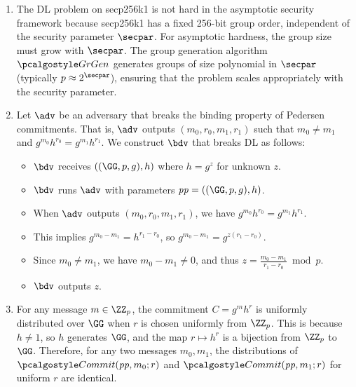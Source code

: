 \begin{enumerate}
  \item The DL problem on secp256k1 is not hard in the asymptotic security framework because secp256k1 has a fixed 256-bit group order, independent of the security parameter $\secpar$.
        For asymptotic hardness, the group size must grow with $\secpar$.
        The group generation algorithm $\grgen$ generates groups of size polynomial in $\secpar$ (typically $p \approx 2^\secpar$), ensuring that the problem scales appropriately with the security parameter.
        
  \item Let $\adv$ be an adversary that breaks the binding property of Pedersen commitments.
        That is, $\adv$ outputs $(m_0, r_0, m_1, r_1)$ such that $m_0 \neq m_1$ and $g^{m_0}h^{r_0} = g^{m_1}h^{r_1}$.
        We construct $\bdv$ that breaks DL as follows:
        \begin{itemize}
          \item $\bdv$ receives $(\gparam, h)$ where $h = g^z$ for unknown $z$.
          \item $\bdv$ runs $\adv$ with parameters $\params = (\gparam, h)$.
          \item When $\adv$ outputs $(m_0, r_0, m_1, r_1)$, we have $g^{m_0}h^{r_0} = g^{m_1}h^{r_1}$.
          \item This implies $g^{m_0 - m_1} = h^{r_1 - r_0}$, so $g^{m_0 - m_1} = g^{z(r_1 - r_0)}$.
          \item Since $m_0 \neq m_1$, we have $m_0 - m_1 \neq 0$, and thus $z = \frac{m_0 - m_1}{r_1 - r_0} \bmod p$.
          \item $\bdv$ outputs $z$.
        \end{itemize}
        
  \item For any message $m \in \ZZ_p$, the commitment $C = g^m h^r$ is uniformly distributed over $\GG$ when $r$ is chosen uniformly from $\ZZ_p$.
        This is because $h \neq 1$, so $h$ generates $\GG$, and the map $r \mapsto h^r$ is a bijection from $\ZZ_p$ to $\GG$.
        Therefore, for any two messages $m_0, m_1$, the distributions of $\algo{Commit}(\params, m_0; r)$ and $\algo{Commit}(\params, m_1; r)$ for uniform $r$ are identical.
        

\end{enumerate}
